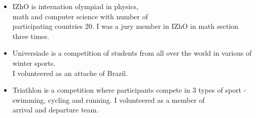 \begin{itemize}
\item IZhO is internation olympiad in physics, \\ math and computer science with number of  \\ participating countries 20. I was a jury member in IZhO in math section three times.
\end{itemize}
\smallskip
{}
\begin{itemize}
\item Universiade is a competition of students from all over the world in various of winter sports.\\ I volunteered as an attache of Brazil.
\end{itemize}
\smallskip
{}
\begin{itemize}
\item Triathlon is a competition where participants compete in
3 types of sport - swimming, cycling and running. I volunteered as a member of \\arrival and departure team.
\end{itemize}








